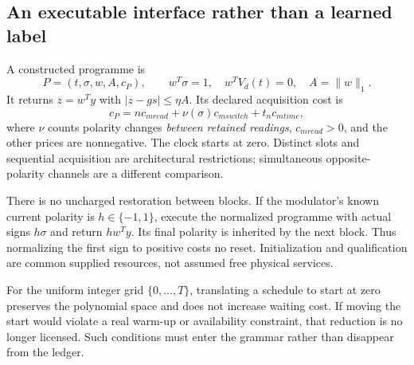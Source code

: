 \documentclass[11pt,letterpaper]{article}
\newcommand{\norm}[1]{\lVert#1\rVert}
\theoremstyle{definition}\newtheorem{definition}[theorem]{Definition}
\theoremstyle{remark}\newtheorem{remark}[theorem]{Remark}
\begin{document}
\subsection{An executable interface rather than a learned label}
A constructed programme is
\begin{equation}
 P=(t,\sigma,w,A,c_P),\qquad
 w^T\sigma=1,\quad w^TV_d(t)=0,\quad A=\norm{w}_1.
 \label{eq:program}
\end{equation}
It returns $z=w^Ty$ with $|z-gs|\le\eta A$. Its declared acquisition cost is
\begin{equation}
 c_P=n c_{
m read}+\nu(\sigma)c_{
m switch}+t_n c_{
m time},
 \label{eq:cost}
\end{equation}
where $\nu$ counts polarity changes \emph{between retained readings}, $c_{
m read}>0$, and the other prices are nonnegative. The clock starts at zero. Distinct slots and sequential acquisition are architectural restrictions; simultaneous opposite-polarity channels are a different comparison.

There is no uncharged restoration between blocks. If the modulator's known current polarity is $h\in\{-1,1\}$, execute the normalized programme with actual signs $h\sigma$ and return $hw^Ty$. Its final polarity is inherited by the next block. Thus normalizing the first sign to positive costs no reset. Initialization and qualification are common supplied resources, not assumed free physical services.

For the uniform integer grid $\{0,\ldots,T\}$, translating a schedule to start at zero preserves the polynomial space and does not increase waiting cost. If moving the start would violate a real warm-up or availability constraint, that reduction is no longer licensed. Such conditions must enter the grammar rather than disappear from the ledger.
\end{document}
